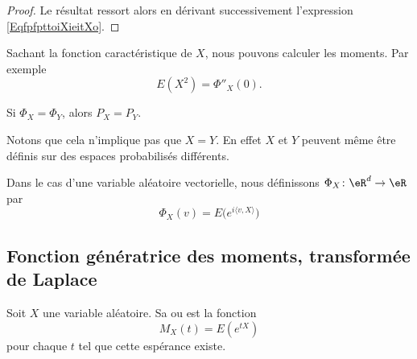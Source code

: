 \begin{proof}
	Le résultat ressort alors en dérivant successivement l'expression \eqref{EqfpfpttoiXieitXo}.
\end{proof}

\begin{example}
	Sachant la fonction caractéristique de \( X\), nous pouvons calculer les moments. Par exemple
	\begin{equation}
		E(X^2)=\Phi''_X(0).
	\end{equation}
\end{example}

\begin{theorem}     \label{ThonMxtTy}
	Si \( \Phi_X=\Phi_Y\), alors \( P_X=P_Y\).
\end{theorem}
Notons que cela n'implique pas que \( X=Y\). En effet \( X\) et \( Y\) peuvent même être définis sur des espaces probabilisés différents.

Dans le cas d'une variable aléatoire vectorielle, nous définissons \( \Phi_X\colon \eR^d\to \eR\) par
\begin{equation}        \label{EqydvDxg}
	\Phi_X(v)=E\big(  e^{i\langle v, X\rangle } \big)
\end{equation}

\subsection{Fonction génératrice des moments, transformée de Laplace}

Soit \( X\) une variable aléatoire. Sa  ou  est la fonction
\begin{equation}
	M_X(t)=E( e^{tX})
\end{equation}
pour chaque \( t\) tel que cette espérance existe.

